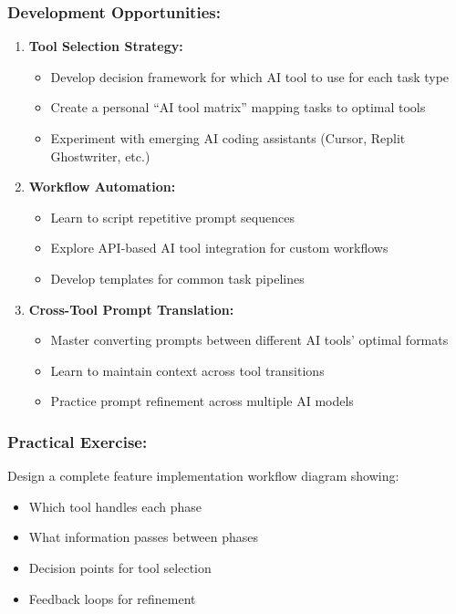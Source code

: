 \documentclass[12pt,a4paper]{article}
\begin{document}
\subsubsection*{Development Opportunities:}

\begin{enumerate}
    \item \textbf{Tool Selection Strategy:}
    \begin{itemize}
        \item Develop decision framework for which AI tool to use for each task type
        \item Create a personal ``AI tool matrix'' mapping tasks to optimal tools
        \item Experiment with emerging AI coding assistants (Cursor, Replit Ghostwriter, etc.)
    \end{itemize}
    
    \item \textbf{Workflow Automation:}
    \begin{itemize}
        \item Learn to script repetitive prompt sequences
        \item Explore API-based AI tool integration for custom workflows
        \item Develop templates for common task pipelines
    \end{itemize}
    
    \item \textbf{Cross-Tool Prompt Translation:}
    \begin{itemize}
        \item Master converting prompts between different AI tools' optimal formats
        \item Learn to maintain context across tool transitions
        \item Practice prompt refinement across multiple AI models
    \end{itemize}
\end{enumerate}

\subsubsection*{Practical Exercise:}

Design a complete feature implementation workflow diagram showing:
\begin{itemize}
    \item Which tool handles each phase
    \item What information passes between phases
    \item Decision points for tool selection
    \item Feedback loops for refinement
\end{itemize}
\end{document}
